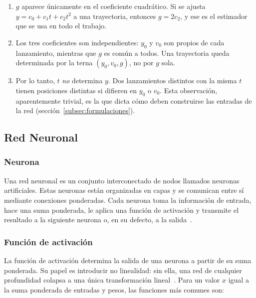 \documentclass[titlepage,11pt]{article}
\begin{document}
\begin{enumerate}
\item $g$ aparece únicamente en el coeficiente cuadrático. Si se ajusta
  $y=c_0+c_1t+c_2t^2$ a una trayectoria, entonces $g=2c_2$, y ese es el
  estimador que se usa en todo el trabajo.
\item Los tres coeficientes son independientes: $y_0$ y $v_0$ son propios de
  cada lanzamiento, mientras que $g$ es común a todos. Una trayectoria queda
  determinada por la terna $(y_0,v_0,g)$, no por $g$ sola.
\item Por lo tanto, $t$ \emph{no} determina $y$. Dos lanzamientos distintos
  con la misma $t$ tienen posiciones distintas si difieren en $y_0$ o $v_0$.
  Esta observación, aparentemente trivial, es la que dicta cómo deben
  construirse las entradas de la red (sección~\ref{subsec:formulaciones}).
\end{enumerate}

\subsection{Red Neuronal}
\label{subsec:redneuronal}

\subsubsection{Neurona}
Una red neuronal es un conjunto interconectado de nodos llamados neuronas
artificiales. Estas neuronas están organizadas en capas y se comunican entre sí
mediante conexiones ponderadas. Cada neurona toma la información de entrada,
hace una suma ponderada, le aplica una función de activación y transmite el
resultado a la siguiente neurona o, en su defecto, a la
salida~\cite{antonio_2023_introduccin,ibm_qu,santana_2018_1,santana_2018_2,santana_2018_3,santana_2018_3_5}.

\subsubsection{Función de activación}
La función de activación determina la salida de una neurona a partir de su suma
ponderada. Su papel es introducir no linealidad: sin ella, una red de cualquier
profundidad colapsa a una única transformación
lineal~\cite{wikipediacontributors_2018_activation}. Para un valor $x$ igual a
la suma ponderada de entradas y pesos, las funciones más comunes son:
\end{document}
